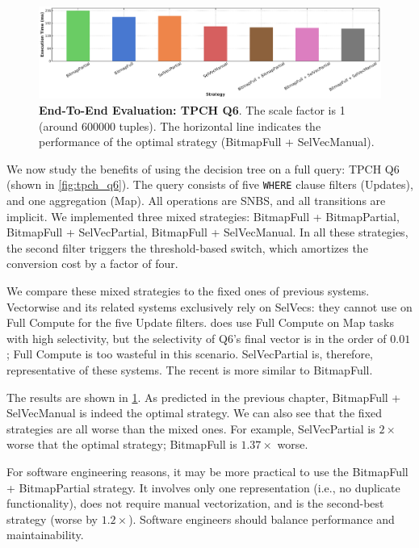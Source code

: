 \documentclass[12pt]{cmuthesis}
\begin{document}
\begin{figure}[t!]
    \centering
    \includegraphics[width=.9\linewidth]{eval/q6_bench.pdf}
    \caption{\textbf{End-To-End Evaluation: TPCH Q6}. The scale factor is 1 (around $600000$ tuples). The horizontal line indicates the performance of the optimal strategy (BitmapFull + SelVecManual).}
    \label{fig:tpch_q6_perf}
\end{figure}


We now study the benefits of using the decision tree on a full query: TPCH Q6 \cite{tpch} (shown in \cref{fig:tpch_q6}). The query consists of five \texttt{WHERE} clause filters (Updates), and one aggregation (Map). All operations are SNBS, and all transitions are implicit. We implemented three mixed strategies: BitmapFull + BitmapPartial, BitmapFull + SelVecPartial, BitmapFull + SelVecManual. In all these strategies, the second filter triggers the threshold-based switch, which amortizes the conversion cost by a factor of four.

We compare these mixed strategies to the fixed ones of previous systems. Vectorwise and its related systems \cite{vectorwise, miro_adapt, everything_vectorized, sompolski_vec} exclusively rely on SelVecs: they cannot use on Full Compute for the five Update filters. \cite{miro_adapt} does use Full Compute on Map tasks with high selectivity, but the selectivity of Q6's final vector is in the order of $0.01$; Full Compute is too wasteful in this scenario. SelVecPartial is, therefore, representative of these systems. The recent \cite{orestis_bitmap} is more similar to BitmapFull.

The results are shown in \cref{fig:tpch_q6_perf}. As predicted in the previous chapter, BitmapFull + SelVecManual is indeed the optimal strategy.  We can also see that the fixed strategies are all worse than the mixed ones. For example, SelVecPartial is $2\times$ worse that the optimal strategy; BitmapFull is $1.37\times$ worse.

For software engineering reasons, it may be more practical to use the BitmapFull + BitmapPartial strategy. It involves only one representation (i.e., no duplicate functionality), does not require manual vectorization, and is the second-best strategy (worse by $1.2\times$). Software engineers should balance performance and maintainability.
\end{document}
